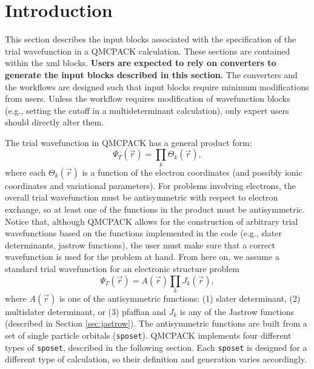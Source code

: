 \section{Introduction}
\label{sec:intro_wavefunction}

This section describes the input blocks associated with the specification of the trial wavefunction in a QMCPACK calculation. These sections are contained within the  xml blocks. \textbf{Users are expected to rely on converters to generate the input blocks described in this section.} The converters and the workflows are designed such that input blocks require minimum modifications from users. Unless the workflow requires modification of wavefunction blocks (e.g., setting the cutoff in a multideterminant calculation), only expert users should directly alter them.
  
The trial wavefunction in QMCPACK has a general product form:
\begin{equation}
\Psi_T(\vec{r}) = \prod_k \Theta_k(\vec{r}) ,
\end{equation}
where each $\Theta_k(\vec{r})$ is a function of the electron coordinates (and possibly ionic coordinates and variational parameters). For problems involving electrons, the overall trial wavefunction must be antisymmetric with respect to electron exchange, so at least one of the functions in the product must be antisymmetric. Notice that, although QMCPACK allows for the construction of arbitrary trial wavefunctions based on the functions implemented in the code (e.g., slater determinants, jastrow functions), the user must make sure that a correct wavefunction is used for the problem at hand. From here on, we assume a standard trial wavefunction for an electronic structure problem 
\begin{equation}
\Psi_T(\vec{r}) =  \textit{A}(\vec{r}) \prod_k \textit{J}_k(\vec{r}),
\end{equation}
where $\textit{A}(\vec{r})$ is one of the antisymmetric functions: (1) slater determinant, (2) multislater determinant, or (3) pfaffian and $\textit{J}_k$ is any of the Jastrow functions (described in Section \ref{sec:jastrow}).  The antisymmetric functions are built from a set of single particle orbitals (\texttt{sposet}). QMCPACK implements four different types of \texttt{sposet}, described in the following section. Each \texttt{sposet} is designed for a different type of calculation, so their definition and generation varies accordingly. 

